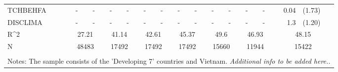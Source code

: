 \documentclass[10pt]{article}
\begin{document}
\begin{table}[htbp]
\begin{tabular}{lrlrlrlrlrlrlrl}
TCHBEHFA & \multicolumn{1}{c}{-} & \multicolumn{1}{c}{-} & \multicolumn{1}{c}{-} & \multicolumn{1}{c}{-} & \multicolumn{1}{c}{-} & \multicolumn{1}{c}{-} & \multicolumn{1}{c}{-} & \multicolumn{1}{c}{-} & \multicolumn{1}{c}{-} & \multicolumn{1}{c}{-} & \multicolumn{1}{c}{-} & \multicolumn{1}{c}{-} & 0.04  & (1.73) \\[0.2em]
DISCLIMA & \multicolumn{1}{c}{-} & \multicolumn{1}{c}{-} & \multicolumn{1}{c}{-} & \multicolumn{1}{c}{-} & \multicolumn{1}{c}{-} & \multicolumn{1}{c}{-} & \multicolumn{1}{c}{-} & \multicolumn{1}{c}{-} & \multicolumn{1}{c}{-} & \multicolumn{1}{c}{-} & \multicolumn{1}{c}{-} & \multicolumn{1}{c}{-} & 1.3   & (1.20) \\[0.2em]

    R^{2}   & \multicolumn{2}{c}{27.21} & \multicolumn{2}{c}{41.14} & \multicolumn{2}{c}{42.61} & \multicolumn{2}{c}{45.37} & \multicolumn{2}{c}{49.6} & \multicolumn{2}{c}{46.93} & \multicolumn{2}{c}{48.15} \\
    N     & \multicolumn{2}{c}{48483} & \multicolumn{2}{c}{17492} & \multicolumn{2}{c}{17492} & \multicolumn{2}{c}{17492} & \multicolumn{2}{c}{15660} & \multicolumn{2}{c}{11944} & \multicolumn{2}{c}{15422} \\
    
    \bottomrule
    
        \\
        \multicolumn{15}{l}{Notes: The sample consists of the 'Developing 7' countries and Vietnam. \textit{Additional info to be added here..}}\\
    
    \end{tabular}%
  \label{tab:addlabel}%
\end{table}%
\end{document}
